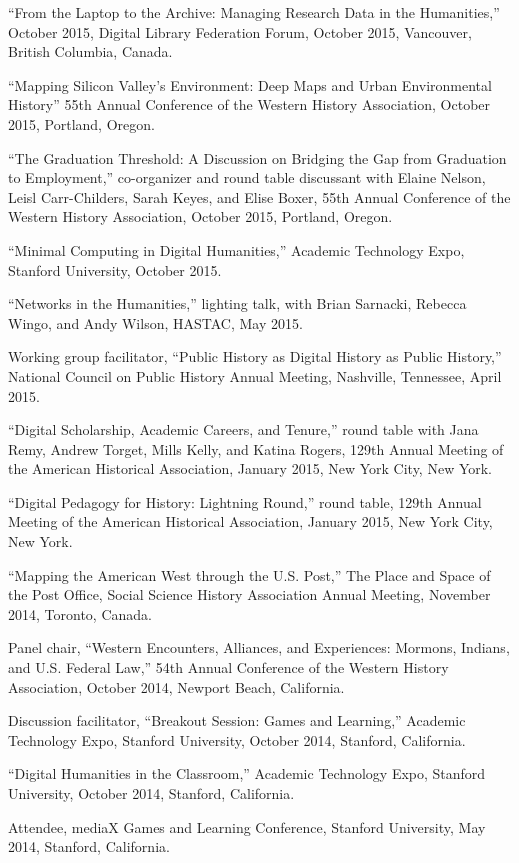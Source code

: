 ``From the Laptop to the Archive: Managing Research Data in the
Humanities,'' October 2015, Digital Library Federation Forum, October
2015, Vancouver, British Columbia, Canada.

``Mapping Silicon Valley's Environment: Deep Maps and Urban
Environmental History'' 55th Annual Conference of the Western History
Association, October 2015, Portland, Oregon.

``The Graduation Threshold: A Discussion on Bridging the Gap from
Graduation to Employment,'' co-organizer and round table discussant with
Elaine Nelson, Leisl Carr-Childers, Sarah Keyes, and Elise Boxer, 55th
Annual Conference of the Western History Association, October 2015,
Portland, Oregon.

``Minimal Computing in Digital Humanities,'' Academic Technology Expo,
Stanford University, October 2015.

``Networks in the Humanities,'' lighting talk, with Brian Sarnacki,
Rebecca Wingo, and Andy Wilson, HASTAC, May 2015.

Working group facilitator, ``Public History as Digital History as Public
History,'' National Council on Public History Annual Meeting, Nashville,
Tennessee, April 2015.

``Digital Scholarship, Academic Careers, and Tenure,'' round table with
Jana Remy, Andrew Torget, Mills Kelly, and Katina Rogers, 129th Annual
Meeting of the American Historical Association, January 2015, New York
City, New York.

``Digital Pedagogy for History: Lightning Round,'' round table, 129th
Annual Meeting of the American Historical Association, January 2015, New
York City, New York.

``Mapping the American West through the U.S. Post,'' The Place and Space
of the Post Office, Social Science History Association Annual Meeting,
November 2014, Toronto, Canada.

Panel chair, ``Western Encounters, Alliances, and Experiences: Mormons,
Indians, and U.S. Federal Law,'' 54th Annual Conference of the Western
History Association, October 2014, Newport Beach, California.

Discussion facilitator, ``Breakout Session: Games and Learning,''
Academic Technology Expo, Stanford University, October 2014, Stanford,
California.

``Digital Humanities in the Classroom,'' Academic Technology Expo,
Stanford University, October 2014, Stanford, California.

Attendee, mediaX Games and Learning Conference, Stanford University, May
2014, Stanford, California.

